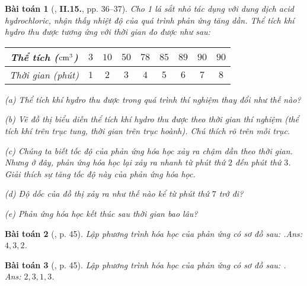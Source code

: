 \documentclass{article}
\numberwithin{equation}{section}
\newtheorem{baitoan}{Bài toán}
\begin{document}
\begin{baitoan}[\cite{Truong_BTNC_Hoa_Hoc_8_2022}, \textbf{II.15.}, pp. 36--37]
	Cho 1 lá sắt nhỏ tác dụng với dung dịch acid hydrochloric, nhận thấy nhiệt độ của quá trình phản ứng tăng dần. Thể tích khí hydro thu được tương ứng với thời gian đo được như sau:
	
	\begin{table}[H]
		\centering
		\begin{tabular}{|c|c|c|c|c|c|c|c|c|}
			\hline
			Thể tích ($\rm cm^3$) & $3$ & $10$ & $50$ & $78$ & $85$ & $89$ & $90$ & $90$ \\
			\hline
			Thời gian (phút) & $1$ & $2$ & $3$ & $4$ & $5$ & $6$ & $7$ & $8$ \\
			\hline
		\end{tabular}
	\end{table}
	\begin{enumerate*}
		\item[(a)] Thể tích khí hydro thu được trong quá trình thí nghiệm thay đổi như thế nào?
		\item[(b)] Vẽ đồ thị biểu diễn thể tích khí hydro thu được theo thời gian thí nghiệm (thể tích khí trên trục tung, thời gian trên trục hoành). Chú thích rõ trên mỗi trục.
		\item[(c)] Chúng ta biết tốc độ của phản ứng hóa học xảy ra chậm dần theo thời gian. Nhưng ở đây, phản ứng hóa học lại xảy ra nhanh từ phút thứ $2$ đến phút thứ $3$. Giải thích sự tăng tốc độ này của phản ứng hóa học.
		\item[(d)] Độ dốc của đồ thị xảy ra như thế nào kể từ phút thứ $7$ trở đi?
		\item[(e)] Phản ứng hóa học kết thúc sau thời gian bao lâu?
	\end{enumerate*}
\end{baitoan}

\begin{baitoan}[\cite{An_400_BT_Hoa_Hoc_8_2020}, p. 45]
	Lập phương trình hóa học của phản ứng có sơ đồ sau: \emph{}.\hfill\textsf{Ans:} $4,3,2$.
\end{baitoan}

\begin{baitoan}[\cite{An_400_BT_Hoa_Hoc_8_2020}, p. 45]
	Lập phương trình hóa học của phản ứng có sơ đồ sau: \emph{}.\\\mbox{}\hfill\textsf{Ans:} $2,3,1,3$.
\end{baitoan}

\end{document}
